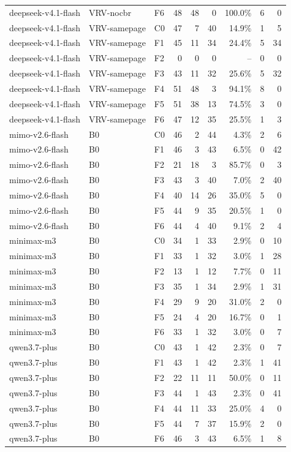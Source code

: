 \begin{tabular}{lllrrrrrr}
deepseek-v4.1-flash & VRV-nocbr & F6 & 48 & 48 & 0 & 100.0\% & 6 & 0 \\
deepseek-v4.1-flash & VRV-samepage & C0 & 47 & 7 & 40 & 14.9\% & 1 & 5 \\
deepseek-v4.1-flash & VRV-samepage & F1 & 45 & 11 & 34 & 24.4\% & 5 & 34 \\
deepseek-v4.1-flash & VRV-samepage & F2 & 0 & 0 & 0 & -- & 0 & 0 \\
deepseek-v4.1-flash & VRV-samepage & F3 & 43 & 11 & 32 & 25.6\% & 5 & 32 \\
deepseek-v4.1-flash & VRV-samepage & F4 & 51 & 48 & 3 & 94.1\% & 8 & 0 \\
deepseek-v4.1-flash & VRV-samepage & F5 & 51 & 38 & 13 & 74.5\% & 3 & 0 \\
deepseek-v4.1-flash & VRV-samepage & F6 & 47 & 12 & 35 & 25.5\% & 1 & 3 \\
mimo-v2.6-flash & B0 & C0 & 46 & 2 & 44 & 4.3\% & 2 & 6 \\
mimo-v2.6-flash & B0 & F1 & 46 & 3 & 43 & 6.5\% & 0 & 42 \\
mimo-v2.6-flash & B0 & F2 & 21 & 18 & 3 & 85.7\% & 0 & 3 \\
mimo-v2.6-flash & B0 & F3 & 43 & 3 & 40 & 7.0\% & 2 & 40 \\
mimo-v2.6-flash & B0 & F4 & 40 & 14 & 26 & 35.0\% & 5 & 0 \\
mimo-v2.6-flash & B0 & F5 & 44 & 9 & 35 & 20.5\% & 1 & 0 \\
mimo-v2.6-flash & B0 & F6 & 44 & 4 & 40 & 9.1\% & 2 & 4 \\
minimax-m3 & B0 & C0 & 34 & 1 & 33 & 2.9\% & 0 & 10 \\
minimax-m3 & B0 & F1 & 33 & 1 & 32 & 3.0\% & 1 & 28 \\
minimax-m3 & B0 & F2 & 13 & 1 & 12 & 7.7\% & 0 & 11 \\
minimax-m3 & B0 & F3 & 35 & 1 & 34 & 2.9\% & 1 & 31 \\
minimax-m3 & B0 & F4 & 29 & 9 & 20 & 31.0\% & 2 & 0 \\
minimax-m3 & B0 & F5 & 24 & 4 & 20 & 16.7\% & 0 & 1 \\
minimax-m3 & B0 & F6 & 33 & 1 & 32 & 3.0\% & 0 & 7 \\
qwen3.7-plus & B0 & C0 & 43 & 1 & 42 & 2.3\% & 0 & 7 \\
qwen3.7-plus & B0 & F1 & 43 & 1 & 42 & 2.3\% & 1 & 41 \\
qwen3.7-plus & B0 & F2 & 22 & 11 & 11 & 50.0\% & 0 & 11 \\
qwen3.7-plus & B0 & F3 & 44 & 1 & 43 & 2.3\% & 0 & 41 \\
qwen3.7-plus & B0 & F4 & 44 & 11 & 33 & 25.0\% & 4 & 0 \\
qwen3.7-plus & B0 & F5 & 44 & 7 & 37 & 15.9\% & 2 & 0 \\
qwen3.7-plus & B0 & F6 & 46 & 3 & 43 & 6.5\% & 1 & 8 \\
\bottomrule
\end{tabular}

